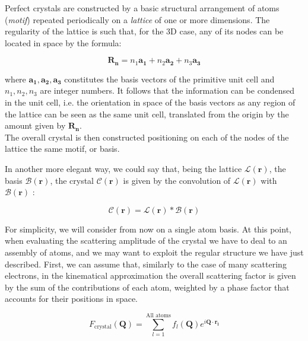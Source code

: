 Perfect crystals are constructed by a basic structural arrangement of atoms (\textit{motif}) repeated periodically on a 
\textit{lattice} of one or more dimensions. The regularity of the lattice is such that, for the 3D case, any of its nodes 
can be located in space by the formula: 

\begin{equation}
   \mathbf {R_n} = n_1\mathbf{a_1} + n_2\mathbf{a_2} + n_3\mathbf{a_3}
   \label{eq:lattice}
\end{equation}

where ${\mathbf{a_1},\mathbf{a_2},\mathbf{a_3}}$ constitutes the basis vectors of the primitive unit cell and $n_1, n_2, n_3$ are integer numbers. 
It follows that the information can be condensed in the unit cell, i.e. the orientation in space of the basis vectors as any region 
of the lattice can be seen as the same unit cell, translated from the origin by the amount given by $\mathbf {R_n}$. \\

The overall crystal is then constructed positioning on each of the nodes of the lattice the same motif, or basis. 

In another more elegant way, we could say that, being the lattice $\mathcal{L}(\mathbf r)$, the basis $\mathcal{B}(\mathbf r)$, the crystal 
$\mathcal{C}(\mathbf r)$ is given by the convolution of $\mathcal{L}(\mathbf r)$ with $\mathcal{B}(\mathbf r)$ : 

\begin{equation}
    \mathcal{C}(\mathbf r)  = \mathcal{L}(\mathbf r) \ast  \mathcal{B}(\mathbf r)  
    \label{eq:conv}
 \end{equation}

 For simplicity, we will consider from now on a single atom basis.
 At this point, when evaluating the scattering amplitude of the crystal we have to deal to an assembly of atoms, and we 
 may want to exploit the regular structure we have just described. 
 First, we can assume that, similarly to the case of many scattering electrons, in the kinematical approximation the overall 
 scattering factor is given by the sum of the contributions of each atom, weighted by a phase factor that accounts for their 
 positions in space. 

 \begin{equation}
    F_{\text{crystal}}(\mathbf{Q}) = 
   \sum_{l=1}^{\text{All atoms}} f_l(\mathbf Q) e^{i \mathbf{Q} \cdot \mathbf{r_l}} 
   \label{eq:crystalformfactor}
\end{equation} 

